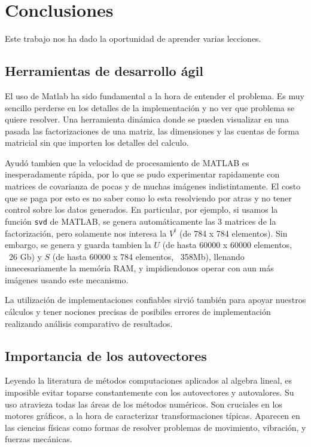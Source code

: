 \section{Conclusiones}

Este trabajo nos ha dado la oportunidad de aprender varias lecciones.

\subsection{Herramientas de desarrollo \'agil}

El uso de Matlab ha sido fundamental a la hora de entender el problema.
Es muy sencillo perderse en los detalles de la implementaci\'on y no ver que
problema se quiere resolver. Una herramienta din\'amica donde se pueden visualizar
en una pasada las factorizaciones de una matriz, las dimensiones y las cuentas
de forma matricial sin que importen los detalles del calculo.

Ayud\'o tambien que la velocidad de procesamiento de MATLAB es inesperadamente
r\'apida, por lo que se pudo experimentar rapidamente con matrices de covarianza
de pocas y de muchas im\'agenes indistintamente. El costo que se paga por esto es
no saber como lo esta resolviendo por atras y no tener control sobre los datos generados.
En particular, por ejemplo, si usamos la funci\'on \texttt{svd} de MATLAB, se genera
autom\'aticamente las 3 matrices de la factorizaci\'on, pero solamente nos interesa
la $V^t$ (de 784 x 784 elementos). Sin embargo, se genera y guarda tambien la $U$ (de hasta
60000 x 60000 elementos, ~26 Gb) y $S$ (de hasta 60000 x 784 elementos, ~358Mb), llenando innecesariamente
la mem\'oria RAM, y impidiendonos operar con aun m\'as im\'agenes usando este mecanismo.

La utilizaci\'on de implementaciones confiables sirvi\'o tambi\'en para apoyar nuestros
c\'alculos y tener nociones precisas de posibiles errores de implementaci\'on
realizando an\'alisis comparativo de resultados.

\subsection{Importancia de los autovectores}

Leyendo la literatura de m\'etodos computaciones aplicados al algebra lineal, es
imposible evitar toparse constantemente con los autovectores y autovalores. Su
uso atravieza todas las \'areas de los m\'etodos num\'ericos. Son cruciales
en los motores gr\'aficos, a la hora de caracterizar transformaciones t\'ipicas.
Aparecen en las ciencias f\'isicas como formas de resolver problemas de movimiento,
vibraci\'on, y fuerzas mec\'anicas.

